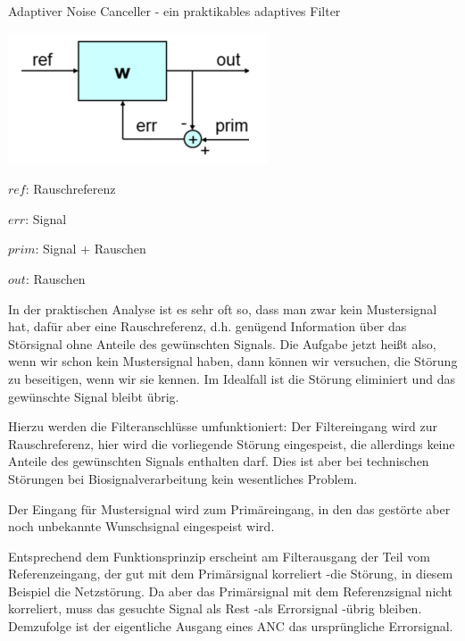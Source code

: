 \documentclass[a4paper]{article}
\begin{document}
\begin{multicols}{3}
  Adaptiver Noise Canceller - ein praktikables adaptives Filter

  \begin{itemize*}
    \item \includegraphics[width=.5\linewidth]{Assets/Biosignalverarbeitung-adaptiver-filter-noise-canceller.png}
    \item $ref$: Rauschreferenz
    \item $err$: Signal
    \item $prim$: Signal + Rauschen
    \item $out$: Rauschen
    \item In der praktischen Analyse ist es sehr oft so, dass man zwar kein Mustersignal hat, dafür aber eine Rauschreferenz, d.h. genügend Information über das Störsignal ohne Anteile des gewünschten Signals. Die Aufgabe jetzt heißt also, wenn wir schon kein Mustersignal haben, dann können wir versuchen, die Störung zu beseitigen, wenn wir sie kennen. Im Idealfall ist die Störung eliminiert und das gewünschte Signal bleibt übrig.
    \item Hierzu werden die Filteranschlüsse umfunktioniert: Der Filtereingang wird zur Rauschreferenz, hier wird die vorliegende Störung eingespeist, die allerdings keine Anteile des gewünschten Signals enthalten darf. Dies ist aber bei technischen Störungen bei Biosignalverarbeitung kein wesentliches Problem.
    \item Der Eingang für Mustersignal wird zum Primäreingang, in den das gestörte aber noch unbekannte Wunschsignal eingespeist wird.
    \item Entsprechend dem Funktionsprinzip erscheint am Filterausgang der Teil vom Referenzeingang, der gut mit dem Primärsignal korreliert -die Störung, in diesem Beispiel die Netzstörung. Da aber das Primärsignal mit dem Referenzsignal nicht korreliert, muss das gesuchte Signal als Rest -als Errorsignal -übrig bleiben. Demzufolge ist der eigentliche Ausgang eines ANC das ursprüngliche Errorsignal.

\end{itemize*}
\end{multicols}
\end{document}
